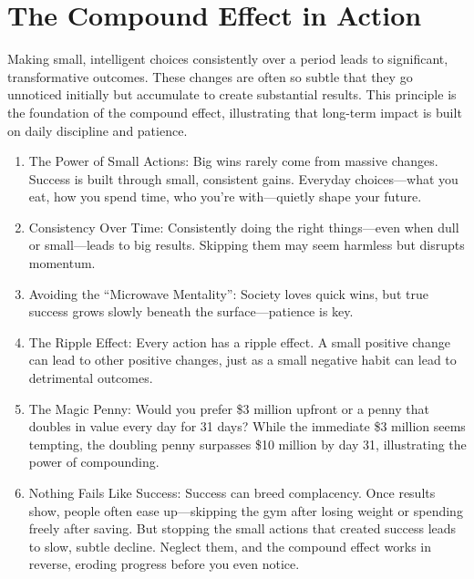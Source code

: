\section{The Compound Effect in Action}

Making small, intelligent choices consistently over a period leads to significant, transformative outcomes. These changes are often so subtle that they go unnoticed initially but accumulate to create substantial results. This principle is the foundation of the compound effect, illustrating that long-term impact is built on daily discipline and patience.

\begin{enumerate}
    \item The Power of Small Actions: Big wins rarely come from massive changes. Success is built through small, consistent gains. Everyday choices—what you eat, how you spend time, who you’re with—quietly shape your future.

    \item{Consistency Over Time}: Consistently doing the right things—even when dull or small—leads to big results. Skipping them may seem harmless but disrupts momentum.

    \item{Avoiding the “Microwave Mentality”}: Society loves quick wins, but true success grows slowly beneath the surface—patience is key.

    \item{The Ripple Effect}: Every action has a ripple effect. A small positive change can lead to other positive changes, just as a small negative habit can lead to detrimental outcomes.

    \item{The Magic Penny}: Would you prefer \$3 million upfront or a penny that doubles in value every day for 31 days? While the immediate \$3 million seems tempting, the doubling penny surpasses \$10 million by day 31, illustrating the power of compounding.

    \item {Nothing Fails Like Success}: Success can breed complacency. Once results show, people often ease up—skipping the gym after losing weight or spending freely after saving. But stopping the small actions that created success leads to slow, subtle decline. Neglect them, and the compound effect works in reverse, eroding progress before you even notice.
\end{enumerate}
